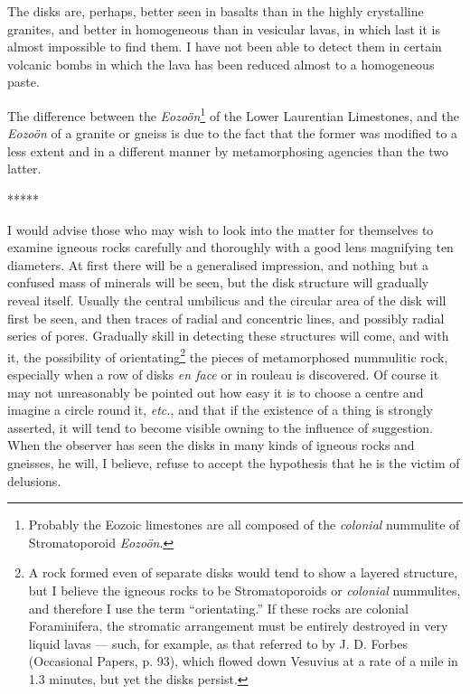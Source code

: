 \documentclass[a4paper, 12pt, oneside]{article}
\begin{document}
The disks are, perhaps, better seen in basalts than in the highly crystalline granites, and better in homogeneous than in vesicular lavas, in which last it is almost impossible to find them. I have not been able to detect them in certain volcanic bombs in which the lava has been reduced almost to a homogeneous paste.

The difference between the \emph{Eozoön}\footnote{Probably the Eozoic limestones are all composed of the \emph{colonial} nummulite of Stromatoporoid \emph{Eozoön}.} of the Lower Laurentian Limestones, and the \emph{Eozoön} of a granite or gneiss is due to the fact that the former was modified to a less extent and in a different manner by metamorphosing agencies than the two latter.

\centerline{*\hspace{15mm}*\hspace{15mm}*\hspace{15mm}*\hspace{15mm}*}
\bigskip

I would advise those who may wish to look into the matter for themselves to examine igneous rocks carefully and thoroughly with a good lens magnifying ten diameters. At first there will be a generalised impression, and nothing but a confused mass of minerals will be seen, but the disk structure will gradually reveal itself. Usually the central umbilicus and the circular area of the disk will first be seen, and then traces of radial and concentric lines, and possibly radial series of pores. Gradually skill in detecting these structures will come, and with it, the possibility of orientating\footnote{A rock formed even of separate disks would tend to show a layered structure, but I believe the igneous rocks to be Stromatoporoids or \emph{colonial} nummulites, and therefore I use the term ``orientating.'' If these rocks are colonial Foraminifera, the stromatic arrangement must be entirely destroyed in very liquid lavas --- such, for example, as that referred to by J. D. Forbes (Occasional Papers, p. 93), which flowed down Vesuvius at a rate of a mile in 1.3 minutes, but yet the disks persist.} the pieces of metamorphosed nummulitic rock, especially when a row of disks \emph{en face} or in rouleau is discovered. Of course it may not unreasonably be pointed out how easy it is to choose a centre and imagine a circle round it, \emph{etc.}, and that if the existence of a thing is strongly asserted, it will tend to become visible owning to the influence of suggestion. When the observer has seen the disks in many kinds of igneous rocks and gneisses, he will, I believe, refuse to accept the hypothesis that he is the victim of delusions.
\end{document}
